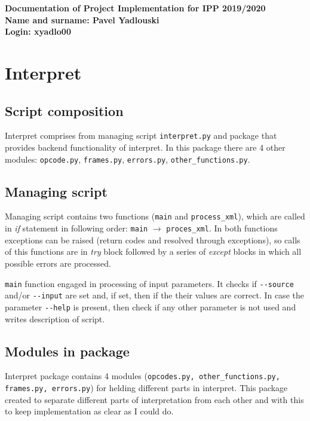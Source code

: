 \documentclass[10pt,a4paper]{article}
\begin{document}
\noindent\textbf{Documentation of Project Implementation for IPP 2019/2020\\
Name and surname: Pavel Yadlouski\\
Login: xyadlo00\\}

\section{Interpret}
\subsection{Script composition}

Interpret comprises from managing script \texttt{interpret.py} and package that
provides backend functionality of interpret. In this package there are 4 other
modules: \texttt{opcode.py}, \texttt{frames.py}, \texttt{errors.py}, 
\texttt{other\_functions.py}. 

\subsection{Managing script}

Managing script contains two functions (\texttt{main} and \texttt{process\_xml}),
which are called in \textit{if} statement in following order: \texttt{main} 
$\rightarrow$ \texttt{proces\_xml}. In both functions exceptions can be raised 
(return codes and resolved through exceptions), so calls of this functions are 
in \textit{try} block followed by a series of \textit{except} blocks in which 
all possible errors are processed.

\texttt{main} function engaged in processing of input parameters. It checks if 
\texttt{-{}-source} and/or \texttt{-{}-input} are set and, if set, then if the
their values are correct. In case the parameter \texttt{-{}-help} is present,
then check if any other parameter is not used and writes description of script.

\subsection{Modules in package}

Interpret package contains 4 modules (\texttt{opcodes.py, other\_functions.py, 
frames.py, errors.py}) for helding different parts in interpret. This package 
created to separate different parts of interpretation from each other and with 
this to keep implementation as clear as I could do. 
\end{document}
